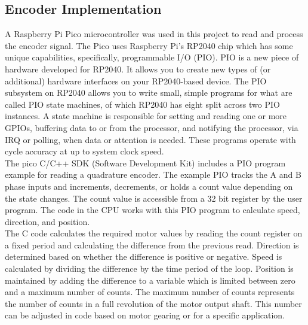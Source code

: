 \documentclass[main.tex]{subfiles}
\begin{document}
\subsection{Encoder Implementation}

A Raspberry Pi Pico microcontroller was used in this project to read and process the encoder signal. The Pico uses Raspberry Pi’s RP2040 chip which has some unique capabilities, specifically, programmable I/O (PIO). PIO is a new piece of hardware developed for RP2040. It allows you to create new types of (or additional) hardware interfaces on your RP2040-based device. The PIO subsystem on RP2040 allows you to write small, simple programs for what are called PIO state machines, of which RP2040 has eight split across two PIO instances. A state machine is responsible for setting and reading one or more GPIOs, buffering data to or from the processor, and notifying the processor, via IRQ or polling, when data or attention is needed. These programs operate with cycle accuracy at up to system clock speed.\\

\noindent The pico C/C++ SDK (Software Development Kit) includes a PIO program example for reading a quadrature encoder. The example PIO tracks the A and B phase inputs and increments, decrements, or holds a count value depending on the state changes. The count value is accessible from a 32 bit register by the user program. The code in the CPU works with this PIO program to calculate speed, direction, and position.\\

\noindent The C code calculates the required motor values by reading the count register on a fixed period and calculating the difference from the previous read. Direction is determined based on whether the difference is positive or negative. Speed is calculated by dividing the difference by the time period of the loop. Position is maintained by adding the difference to a variable which is limited between zero and a maximum number of counts. The maximum number of counts represents the number of counts in a full revolution of the motor output shaft. This number can be adjusted in code based on motor gearing or for a specific application.
\end{document}
